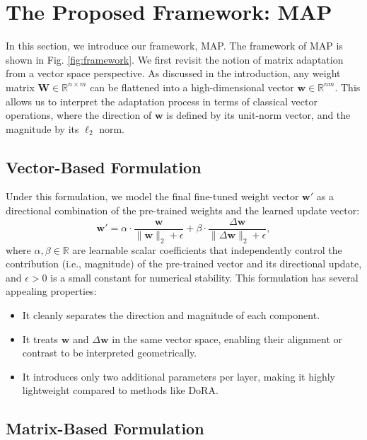 \section{The Proposed Framework: MAP}
\label{sec:method}

In this section, we introduce our framework, MAP.
The framework of MAP is shown in Fig. \ref{fig:framework}.
We first revisit the notion of matrix adaptation from a vector space perspective.
As discussed in the introduction, any weight matrix $\mathbf{W} \in \mathbb{R}^{n \times m}$ can be flattened into a high-dimensional vector $\mathbf{w} \in \mathbb{R}^{nm}$. 
This allows us to interpret the adaptation process in terms of classical vector operations, where the direction of $\mathbf{w}$ is defined by its unit-norm vector, and the magnitude by its $\ell_2$ norm.


\subsection{Vector-Based Formulation}

Under this formulation, we model the final fine-tuned weight vector $\mathbf{w}'$ as a directional combination of the pre-trained weights and the learned update vector:
\begin{equation}
\mathbf{w}' = \alpha \cdot \frac{\mathbf{w}}{\|\mathbf{w}\|_2+\epsilon} + \beta \cdot \frac{\Delta\mathbf{w}}{\|\Delta\mathbf{w}\|_2+\epsilon},
\label{eq:vector-map}
\end{equation}
where $\alpha, \beta \in \mathbb{R}$ are learnable scalar coefficients that independently control the contribution (i.e., magnitude) of the pre-trained vector and its directional update, and $\epsilon>0$ is a small constant for numerical stability.
This formulation has several appealing properties:
\begin{itemize}
    \item It cleanly separates the direction and magnitude of each component.
    \item It treats $\mathbf{w}$ and $\Delta \mathbf{w}$ in the same vector space, enabling their alignment or contrast to be interpreted geometrically.
    \item It introduces only two additional parameters per layer, making it highly lightweight compared to methods like DoRA.


\end{itemize}


\subsection{Matrix-Based Formulation}

